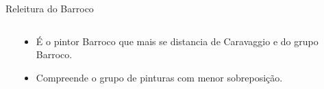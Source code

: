 \documentclass{beamer}
\begin{document}
\begin{frame}{Releitura do Barroco}

\begin{columns}
 \begin{column}{.49\textwidth}
 \end{column}

 \begin{column}{.49\textwidth}
  \begin{itemize}
    \item<1>  É o pintor Barroco que mais se distancia de Caravaggio e do grupo Barroco.

    \item<2> Compreende o grupo de pinturas com
menor sobreposição.
  \end{itemize}
 \end{column}
\end{columns}

\end{frame}
\end{document}
